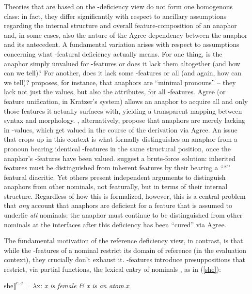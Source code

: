 \documentclass[output=paper, modfonts, nonflat]{langsci/langscibook}
\begin{document}
  Theories that are based on the \ph-deficiency view do not form one
  homogenous class: in fact, they differ significantly with respect to
  ancillary assumptions regarding the internal structure and overall
  feature-composition of an anaphor and, in some cases, also the
  nature of the Agree dependency between the anaphor and its
  antecedent. A fundamental variation arises with respect to
  assumptions concerning what \ph-featural deficiency actually
  means. For one thing, is the anaphor simply unvalued for
  \ph-features or does it lack them altogether (and how can we tell)?
  For another, does it lack some \ph-features or all (and again, how
  can we tell)?  \citet{kratzer:2009} proposes, for instance, that
  anaphors are ``minimal pronouns'' -- they lack not just the values,
  but also the attributes, for all \ph-features. Agree (or feature
  unification, in Kratzer's system) allows an anaphor to acquire all
  and only those features it actually surfaces with, yielding a
  transparent mapping between syntax and
  morphology. \citet{roorwyn:2011}, alternatively, propose that
  anaphors are merely lacking in \ph-values, which get valued in the
  course of the derivation via Agree. An issue that crops up in this
  context is what formally distinguishes an anaphor from a pronoun
  bearing identical \ph-features in the same structural position, once
  the anaphor's \ph-features have been valued. \citet{roorwyn:2011}
  suggest a brute-force solution: inherited features must be
  distinguished from inherent features by their bearing a ``*''
  featural diacritic. Yet others \citep{heinat:2008,reuland:2001,
    Reuland:2011, dechainewiltschko:2012} present independent
  arguments to distinguish anaphors from other nominals, not
  featurally, but in terms of their internal structure. Regardless of
  how this is formalized, however, this is a central problem that
  \textit{any} account that anaphors are deficient for a feature that is
  assumed to underlie \textit{all} nominals: the anaphor must continue
  to be distinguished from other nominals at the interfaces after this
  deficiency has been ``cured'' via Agree.\largerpage

  The fundamental motivation of the reference deficiency view, in
  contrast, is that while the \ph-features of a nominal restrict its
  domain of reference (in the evaluation context), they crucially
  don't exhaust it. \ph-features introduce presuppositions that
  restrict, via partial functions, the lexical entry of nominals
  \citep{heimkratzer:1998}, as in (\ref{she}):
\begin{exe}  
\ex {$\llbracket$}she$\rrbracket^{c,g}$ = $\lambda$x: \textit{x is female \& x is an atom.x} \label{she}
\end{exe}
\end{document}
